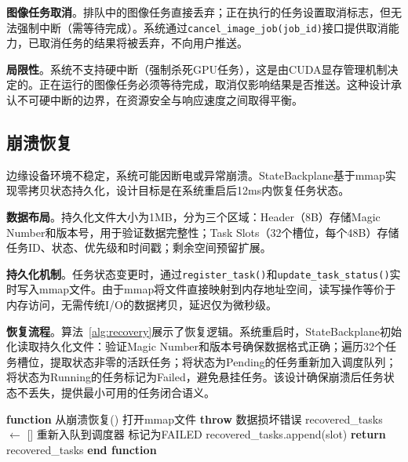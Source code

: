 \textbf{图像任务取消}。排队中的图像任务直接丢弃；正在执行的任务设置取消标志，但无法强制中断（需等待完成）。系统通过\texttt{cancel\_image\_job(job\_id)}接口提供取消能力，已取消任务的结果将被丢弃，不向用户推送。

\textbf{局限性}。系统不支持硬中断（强制杀死GPU任务），这是由CUDA显存管理机制决定的。正在运行的图像任务必须等待完成，取消仅影响结果是否推送。这种设计承认不可硬中断的边界，在资源安全与响应速度之间取得平衡。

\subsection{崩溃恢复}

边缘设备环境不稳定，系统可能因断电或异常崩溃。StateBackplane基于mmap实现零拷贝状态持久化，设计目标是在系统重启后12ms内恢复任务状态。

\textbf{数据布局}。持久化文件大小为1MB，分为三个区域：Header（8B）存储Magic Number和版本号，用于验证数据完整性；Task Slots（32个槽位，每个48B）存储任务ID、状态、优先级和时间戳；剩余空间预留扩展。

\textbf{持久化机制}。任务状态变更时，通过\texttt{register\_task()}和\texttt{update\_task\_status()}实时写入mmap文件。由于mmap将文件直接映射到内存地址空间，读写操作等价于内存访问，无需传统I/O的数据拷贝，延迟仅为微秒级。

\textbf{恢复流程}。算法~\ref{alg:recovery}展示了恢复逻辑。系统重启时，StateBackplane初始化读取持久化文件：验证Magic Number和版本号确保数据格式正确；遍历32个任务槽位，提取状态非零的活跃任务；将状态为Pending的任务重新加入调度队列；将状态为Running的任务标记为Failed，避免悬挂任务。该设计确保崩溃后任务状态不丢失，提供最小可用的任务闭合语义。

\begin{algorithm}[t]
\caption{崩溃恢复流程}
\label{alg:recovery}
\begin{algorithmic}[1]
\STATE \textbf{function} \textsc{从崩溃恢复}()
\STATE 打开mmap文件
    \STATE \textbf{throw} 数据损坏错误
\ENDIF
\STATE recovered\_tasks $\leftarrow$ []
            \STATE 重新入队到调度器
            \STATE 标记为FAILED
        \ENDIF
        \STATE recovered\_tasks.append(slot)
    \ENDIF
\ENDFOR
\STATE \textbf{return} recovered\_tasks
\STATE \textbf{end function}
\end{algorithmic}
\end{algorithm}
